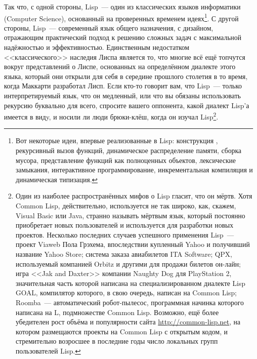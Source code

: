 Так что, с одной стороны, Lisp~--- один из классических языков информатики (Computer
Science), основанный на проверенных временем идеях\footnote{Вот некоторые идеи, впервые
  реализованные в Lisp: конструкция , рекурсивный вызов функций, динамическое
  распределение памяти, сборка мусора, представление функций как полноценных объектов,
  лексические замыкания, интерактивное программирование, инкрементальная компиляция и
  динамическая типизация.}. С другой стороны, Lisp~--- современный язык общего назначения,
с дизайном, отражающим практический подход к решению сложных задач с максимальной
надёжностью и эффективностью. Единственным недостатком <<классического>> наследия Лиспа
является то, что многие всё ещё топчутся вокруг представлений о Лиспе, основанных на
определённом диалекте этого языка, который они открыли для себя в середине прошлого
столетия в то время, когда Маккарти разработал Лисп. Если кто-то говорит вам, что Lisp~---
только интерпретируемый язык, что он медленный, или что вы обязаны использовать рекурсию
буквально для всего, спросите вашего оппонента, какой диалект Lisp'а имеется в видy, и
носили ли люди брюки-клёш, когда он изучал Lisp\footnote{Один из наиболее распространённых мифов
  о Lisp гласит, что он мёртв. Хотя Common Lisp, действительно, используется не так
  широко, как, скажем, Visual Basic или Java, странно называть мёртвым язык, который
  постоянно приобретает новых пользователей и используется для разработки новых
  проектов. Несколько последних случаев успешного применения Lisp~--- проект Viaweb Пола
  Грэхема, впоследствии купленный Yahoo и получивший название Yahoo Store; система
  заказа авиабилетов ITA Software;
  QPX, используемый компанией Orbitz и другими для
  продажи билетов он-лайн; игра <<Jak and Daxter>> компании Naughty Dog для PlayStation 2,
  значительная часть которой написана на специализированном диалекте Lisp GOAL, компилятор которого, в свою
  очередь, написан на Common Lisp; Roomba~--- автоматический робот-пылесос, программная
  начинка которого написана на L, подмножестве Common Lisp. Возможно, ещё более убедителен
  рост объёма и популярности сайта \url{http://common-lisp.net}, на котором
  размещаются проекты на Common Lisp с открытым кодом, и стремительно возросшее в
  последние годы число локальных групп пользователей Lisp.}.


